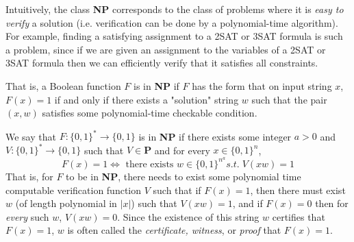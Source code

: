   Intuitively, the class \textbf{NP} corresponds to the class of problems where it is \textit{easy to verify} a solution (i.e. verification can be done by a polynomial-time algorithm). For example, finding a satisfying assignment to a 2SAT or 3SAT formula is such a problem, since if we are given an assignment to the variables of a 2SAT or 3SAT formula then we can efficiently verify that it satisfies all constraints. 

  That is, a Boolean function $F$ is in \textbf{NP} if $F$ has the form that on input string $x$, $F(x) = 1$ if and only if there exists a "solution" string $w$ such that the pair $(x, w)$ satisfies some polynomial-time checkable condition. 

  \begin{definition}
  We say that $F: \{0,1\}^* \longrightarrow \{0,1\}$ is in \textbf{NP} if there exists some integer $a > 0$ and $V: \{0,1\}^* \longrightarrow \{0,1\}$ such that $V \in \mathbf{P}$ and for every $x \in \{0,1\}^n$, 
  \[F(x) = 1 \iff \text{ there exists } w \in \{0,1\}^{n^a} s.t. \; V(x w) = 1\]
  That is, for $F$ to be in \textbf{NP}, there needs to exist some polynomial time computable verification function $V$ such that if $F(x) = 1$, then there must exist $w$ (of length polynomial in $|x|$) such that $V(x w) = 1$, and if $F(x) = 0$ then for \textit{every} such $w$, $V(xw) = 0$. Since the existence of this string $w$ certifies that $F(x) = 1$, $w$ is often called the \textit{certificate, witness}, or \textit{proof} that $F(x) = 1$. 
  \end{definition}

